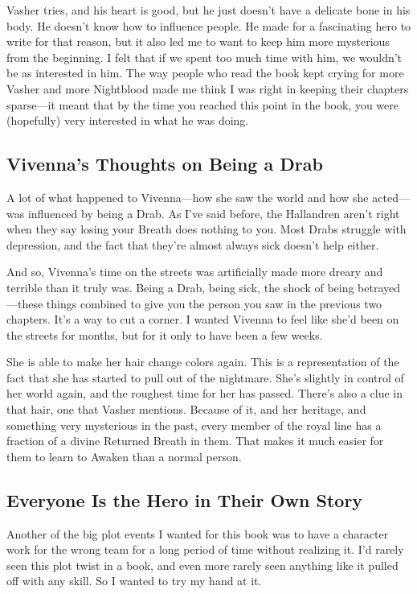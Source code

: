 Vasher tries, and his heart is good, but he just doesn’t have a delicate bone in his body. He doesn’t know how to influence people. He made for a fascinating hero to write for that reason, but it also led me to want to keep him more mysterious from the beginning. I felt that if we spent too much time with him, we wouldn’t be as interested in him. The way people who read the book kept crying for more Vasher and more Nightblood made me think I was right in keeping their chapters sparse—it meant that by the time you reached this point in the book, you were (hopefully) very interested in what he was doing.

\subsection*{Vivenna’s Thoughts on Being a Drab}

A lot of what happened to Vivenna—how she saw the world and how she acted—was influenced by being a Drab. As I’ve said before, the Hallandren aren’t right when they say losing your Breath does nothing to you. Most Drabs struggle with depression, and the fact that they’re almost always sick doesn’t help either.

And so, Vivenna’s time on the streets was artificially made more dreary and terrible than it truly was. Being a Drab, being sick, the shock of being betrayed—these things combined to give you the person you saw in the previous two chapters. It’s a way to cut a corner. I wanted Vivenna to feel like she’d been on the streets for months, but for it only to have been a few weeks.

She is able to make her hair change colors again. This is a representation of the fact that she has started to pull out of the nightmare. She’s slightly in control of her world again, and the roughest time for her has passed. There’s also a clue in that hair, one that Vasher mentions. Because of it, and her heritage, and something very mysterious in the past, every member of the royal line has a fraction of a divine Returned Breath in them. That makes it much easier for them to learn to Awaken than a normal person.

\subsection*{Everyone Is the Hero in Their Own Story}

Another of the big plot events I wanted for this book was to have a character work for the wrong team for a long period of time without realizing it. I’d rarely seen this plot twist in a book, and even more rarely seen anything like it pulled off with any skill. So I wanted to try my hand at it.

